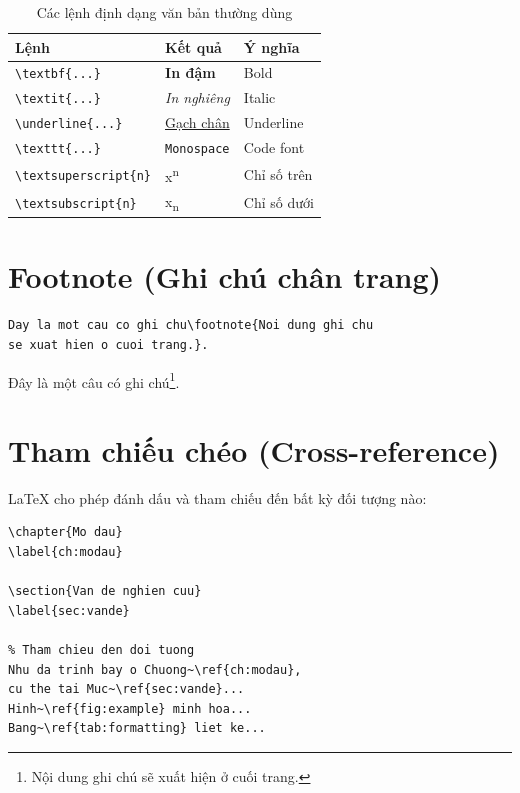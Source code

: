 \begin{table}[H]
\centering
\caption{Các lệnh định dạng văn bản thường dùng}
\label{tab:formatting}
\begin{tabular}{lll}
\toprule
\textbf{Lệnh} & \textbf{Kết quả} & \textbf{Ý nghĩa} \\
\midrule
\verb|\textbf{...}| & \textbf{In đậm} & Bold \\
\verb|\textit{...}| & \textit{In nghiêng} & Italic \\
\verb|\underline{...}| & \underline{Gạch chân} & Underline \\
\verb|\texttt{...}| & \texttt{Monospace} & Code font \\
\verb|\textsuperscript{n}| & x\textsuperscript{n} & Chỉ số trên \\
\verb|\textsubscript{n}| & x\textsubscript{n} & Chỉ số dưới \\
\bottomrule
\end{tabular}
\end{table}

\section{Footnote (Ghi chú chân trang)}

\begin{lstlisting}[style=latexstyle]
Day la mot cau co ghi chu\footnote{Noi dung ghi chu
se xuat hien o cuoi trang.}.
\end{lstlisting}

Đây là một câu có ghi chú\footnote{Nội dung ghi chú sẽ xuất hiện ở cuối trang.}.

\section{Tham chiếu chéo (Cross-reference)}
\label{sec:crossref}

\LaTeX{} cho phép đánh dấu và tham chiếu đến bất kỳ đối tượng nào:

\begin{lstlisting}[style=latexstyle, caption={Cách sử dụng label và ref}]
% Dat nhan (label) cho doi tuong
\chapter{Mo dau}
\label{ch:modau}

\section{Van de nghien cuu}
\label{sec:vande}

% Tham chieu den doi tuong
Nhu da trinh bay o Chuong~\ref{ch:modau},
cu the tai Muc~\ref{sec:vande}...
Hinh~\ref{fig:example} minh hoa...
Bang~\ref{tab:formatting} liet ke...
\end{lstlisting}

